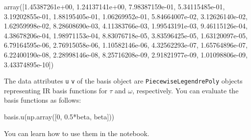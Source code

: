 \documentclass[submission, LectureNotes]{SciPost}
\begin{document}
\begin{python}
array([1.45387261e+00, 1.24137141e+00, 7.98387159e-01, 5.34115485e-01,
3.19202855e-01, 1.88195405e-01, 1.06269952e-01, 5.84664007e-02,
3.12626140e-02, 1.62959998e-02, 8.28608690e-03, 4.11383766e-03,
1.99543191e-03, 9.46115126e-04, 4.38678206e-04, 1.98971153e-04,
8.83076718e-05, 3.83596425e-05, 1.63120097e-05, 6.79164595e-06,
2.76915058e-06, 1.10582146e-06, 4.32562293e-07, 1.65764896e-07,
6.22400190e-08, 2.28998146e-08, 8.25716208e-09, 2.91821977e-09,
1.01098806e-09, 3.43374895e-10])
\end{python}

The data attributes \texttt{u} \texttt{v} of the basis object are
\texttt{PiecewiseLegendrePoly} objects representing IR basis functions
for $\tau$ and $\omega$, respectively.
You can evaluate the basis functions as follows:
\begin{python}
basis.u(np.array([0, 0.5*beta, beta]))
\end{python}
You can learn how to use them in the notebook.
\end{document}
